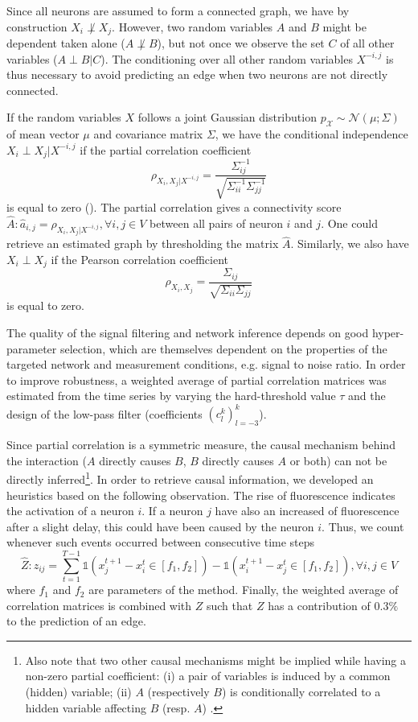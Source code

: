 \documentclass[wcp]{jmlr}
\begin{document}
Since all neurons are assumed to form a connected graph, we
have by construction $X_i \not\perp X_j$. However, two random variables $A$ and $B$ might be
dependent taken alone ($A \not\perp B$), but not once we observe the set  $C$
of all other variables ($A \perp B | C$). The conditioning over all other
random variables $X^{-i,j}$ is thus necessary to avoid predicting an edge when
two neurons are not directly connected.

If the random variables $X$ follows a joint Gaussian distribution
$p_\mathcal{X} \sim \mathcal{N}(\mu; \Sigma)$ of mean vector $\mu$ and
covariance matrix $\Sigma$, we have the conditional independence
$X_i \perp X_j | X^{-i,j}$ if the partial correlation coefficient
\[
\rho_{X_i, X_j | X^{-i,j}}
= \frac{\Sigma^{-1}_{ij}}{\sqrt{\Sigma^{-1}_{ii} \Sigma^{-1}_{jj}}}
\]
is equal to zero (\cite{koller2009probabilistic}). The partial correlation gives
a connectivity score
$\hat{A}: \hat{a}_{i,j} = \rho_{X_i, X_j | X^{-i,j}}, \forall i, j \in V$ between all
pairs of neuron $i$ and $j$. One could retrieve an estimated graph by thresholding
the matrix $\hat{A}$.
Similarly, we also have $X_i \perp X_j$ if the Pearson correlation
coefficient
\[
\rho_{X_i,X_j} = \frac{\Sigma_{ij}}{\sqrt{\Sigma_{ii}
\Sigma_{jj}}}
\]
is equal to zero.

The quality of the signal filtering and network inference depends on
good hyper-parameter selection, which are themselves dependent on the properties
of the targeted network and measurement conditions, e.g. signal to noise ratio.
In order to improve robustness, a weighted average of partial correlation
matrices was estimated from the time series by varying the hard-threshold value
$\tau$ and the design of the low-pass filter (coefficients $(c_l^k)_{l=-3}^k$).


Since partial correlation is a symmetric measure, the causal mechanism behind the
interaction ($A$ directly causes $B$, $B$ directly causes $A$ or both) can not
be directly inferred\footnote{Also note that two other causal mechanisms might be
implied while having a non-zero partial coefficient: (i) a pair of variables
is induced by a common (hidden) variable; (ii) $A$ (respectively $B$) is
conditionally correlated to a hidden variable affecting $B$ (resp. $A$)
\cite{de2004discovery}.}.
In order to retrieve causal information, we developed an
heuristics based on the following observation. The rise of fluorescence
indicates the activation of a neuron $i$. If a neuron $j$ have also
an increased of fluorescence after a slight delay, this could have been
caused by the neuron $i$. Thus, we count whenever
such events occurred between consecutive time steps
\[
\hat{Z}: z_{ij} = \sum_{t=1}^{T - 1}
    \mathbb{1}(x_j^{t+1} - x_i^t \in \left[f_1, f_2 \right]) -
    \mathbb{1}(x_i^{t+1} - x_j^t \in \left[f_1, f_2 \right]), \forall i, j \in V
\]
where $f_1$ and $f_2$ are parameters of the method.
Finally, the weighted average of correlation matrices is combined with $Z$ such
that $Z$ has a contribution of $0.3\%$ to the prediction of an edge.
\end{document}
